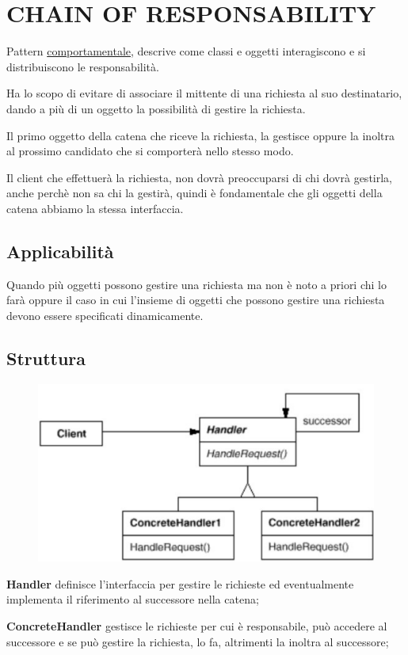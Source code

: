 \chapter{CHAIN OF RESPONSABILITY}

Pattern \underline{comportamentale}, descrive come classi e oggetti interagiscono e si distribuiscono le responsabilità. 
\smallskip

Ha lo scopo di evitare di associare il mittente di una richiesta al suo destinatario, dando a più di un oggetto la possibilità di gestire la richiesta.

Il primo oggetto della catena che riceve la richiesta, la gestisce oppure la inoltra al prossimo candidato che si comporterà nello stesso modo. 
\smallskip

Il client che effettuerà la richiesta, non dovrà preoccuparsi di chi dovrà gestirla, anche perchè non sa chi la gestirà, quindi è fondamentale che gli oggetti 
della catena abbiamo la stessa interfaccia.

\section{Applicabilità}

Quando più oggetti possono gestire una richiesta ma non è noto a priori chi lo farà oppure il caso in cui l’insieme di oggetti che possono gestire una richiesta devono 
essere specificati dinamicamente.

\section{Struttura}

\begin{figure}[H]
    \centering
    \includegraphics[width=0.4\linewidth]{../../immagini/chain_of_responsability/struttura_handler}
\end{figure}

\textbf{Handler} definisce l'interfaccia per gestire le richieste ed eventualmente implementa il riferimento al successore nella catena;

\textbf{ConcreteHandler} gestisce le richieste per cui è responsabile, può accedere al successore e se può gestire la richiesta, lo fa, altrimenti la inoltra al 
successore;

